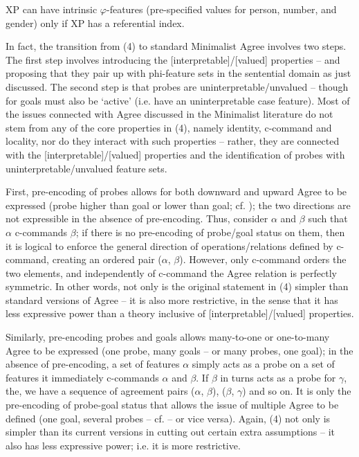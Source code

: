 \documentclass[output=paper]{langsci/langscibook}
\begin{document}
\ea%
    \label{ex:manzini:5}
    XP can have intrinsic $\varphi $-features (pre-specified values for person, number, and gender) only if XP has a referential index.
    \z

           

In fact, the transition from (4) to standard Minimalist Agree involves two steps. The first step involves introducing the [interpretable]/[valued] properties – and proposing that they pair up with phi-feature sets in the sentential domain as just discussed. The second step is that probes are uninterpretable\slash unvalued – though for \citet{Chomsky2001Derivation} goals must also be ‘active’ (i.e. have an uninterpretable case feature). Most of the issues connected with Agree discussed in the Minimalist literature do not stem from any of the core properties in (4), namely identity, c-command and locality, nor do they interact with such properties – rather, they are connected with the [interpretable]/[valued] properties and the identification of probes with uninterpretable\slash unvalued feature sets. 

First, pre-encoding of probes allows for both downward and upward Agree to be expressed (probe higher than goal or lower than goal; cf. \citealt{Zeijlstra2012}); the two directions are not expressible in the absence of pre-encoding. Thus, consider $\alpha $ and $\beta $ such that $\alpha $ c-commands $\beta $; if there is no pre-encoding of probe\slash goal status on them, then it is logical to enforce the general direction of operations\slash relations defined by c-command, creating an ordered pair ($\alpha $, $\beta $). However, only c-command orders the two elements, and independently of c-command the Agree relation is perfectly symmetric. In other words, not only is the original statement in (4) simpler than standard versions of Agree – it is also more restrictive, in the sense that it has less expressive power than a theory inclusive of [interpretable]/[valued] properties.

Similarly, pre-encoding probes and goals allows many-to-one or one-to-many Agree to be expressed (one probe, many goals – or many probes, one goal); in the absence of pre-encoding, a set of features $\alpha $ simply acts as a probe on a set of features it immediately c-commands $\alpha $ and $\beta $. If $\beta $ in turns acts as a probe for $\gamma $, the, we have a sequence of agreement pairs ($\alpha $, $\beta $), ($\beta $, $\gamma $) and so on. It is only the pre-encoding of probe-goal status that allows the issue of multiple Agree to be defined (one goal, several probes – cf. \citealt{Carstens2001} – or vice versa). Again, (4) not only is simpler than its current versions in cutting out certain extra assumptions – it also has less expressive power; i.e. it is more restrictive.
\end{document}
